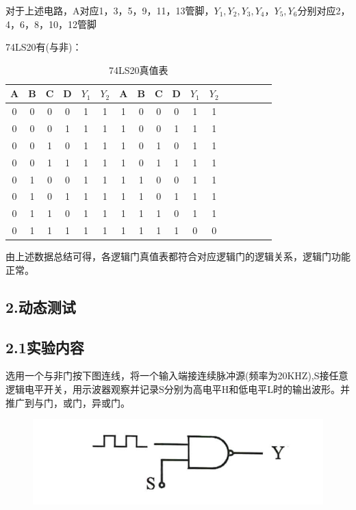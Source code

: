 \documentclass{ctexart}
\begin{document}
    对于上述电路，A对应1，3，5，9，11，13管脚，$Y_1 ,Y_2 , Y_3 , Y_4，Y_5 , Y_6$分别对应2，4，6，8，10，12管脚

    74LS20有(与非)：
   \begin{table}[!ht]
    \centering
    \caption{74LS20真值表}
    \begin{tabular}{|c|c|c|c|c|c|c|c|c|c|c|c|c|c|c|c|c|}
    \hline
        A &  B & C & D & $Y_1$ & $Y_2$ & A &  B & C & D & $Y_1$ & $Y_2$ \\ \hline
        0 & 0 & 0 & 0 & 1 & 1 & 1 & 0 & 0 & 0 & 1 & 1 \\ \hline
        0 & 0 & 0 & 1 & 1 & 1 & 1 & 0 & 0 & 1 & 1 & 1 \\ \hline
        0 & 0 & 1 & 0 & 1 & 1 & 1 & 0 & 1 & 0 & 1 & 1 \\ \hline
        0 & 0 & 1 & 1 & 1 & 1 & 1 & 0 & 1 & 1 & 1 & 1 \\ \hline
        0 & 1 & 0 & 0 & 1 & 1 & 1 & 1 & 0 & 0 & 1 & 1 \\ \hline
        0 & 1 & 0 & 1 & 1 & 1 & 1 & 1 & 0 & 1 & 1 & 1 \\ \hline
        0 & 1 & 1 & 0 & 1 & 1 & 1 & 1 & 1 & 0 & 1 & 1 \\ \hline
        0 & 1 & 1 & 1 & 1 & 1 & 1 & 1 & 1 & 1 & 0 & 0 \\ \hline
    \end{tabular}
\end{table}

    由上述数据总结可得，各逻辑门真值表都符合对应逻辑门的逻辑关系，逻辑门功能正常。
    \subsection*{2.动态测试}
    \subsection*{2.1实验内容}
    选用一个与非门按下图连线，将一个输入端接连续脉冲源(频率为20KHZ),S接任意逻辑电平开关，用示波器观察并记录S分别为高电平H和低电平L时的输出波形。并推广到与门，或门，异或门。
    \begin{figure}[htbp]
        \centering
        \includegraphics[width=13cm]{3.2.1.png}
    \end{figure}
\end{document}
